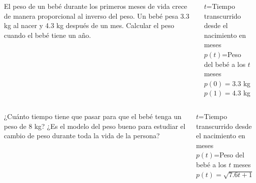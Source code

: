 \documentclass[aspectratio=169,10pt,t]{beamer}
\begin{document}
\begin{frame}
\begin{columns}
\begin{column}[T]{0.6\textwidth}
El peso de un bebé durante los primeros meses de vida crece de manera proporcional al inverso del peso.
Un bebé pesa 3.3 kg al nacer y 4.3 kg después de un mes.
Calcular el peso cuando el bebé tiene un año. 
\end{column}
\begin{column}[T]{0.4\textwidth}
\begin{datos}
$t$=Tiempo transcurrido desde el nacimiento en meses\\
$p(t)$=Peso del bebé a los $t$ meses\\
$p(0)=3.3$ kg\\
$p(1)=4.3$ kg
\end{datos}
\end{column}
\end{columns}
\end{frame}


\begin{frame}
\begin{columns}
\begin{column}[T]{0.6\textwidth}
¿Cuánto tiempo tiene que pasar para que el bebé tenga un peso de 8 kg?
¿Es el modelo del peso bueno para estudiar el cambio de peso durante toda la vida de la persona?
\end{column}
\begin{column}[T]{0.4\textwidth}
\begin{datos}
$t$=Tiempo transcurrido desde el nacimiento en meses\\
$p(t)$=Peso del bebé a los $t$ meses\\
$p(t)=\sqrt{7.6t+10.89}$
\end{datos}
\end{column}
\end{columns}
\end{frame}
\end{document}

